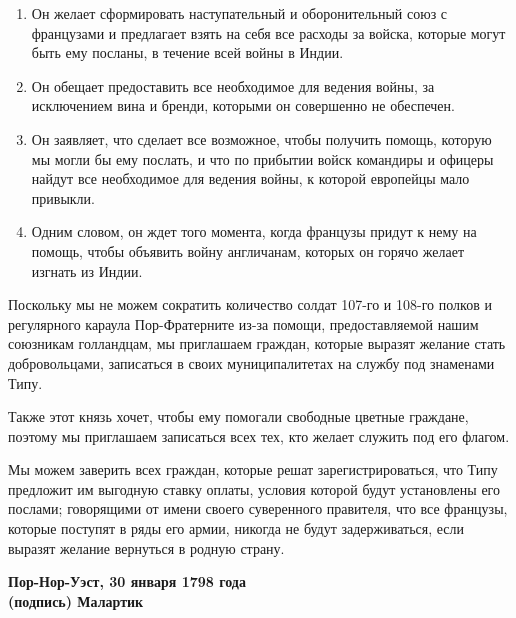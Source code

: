 \documentclass[
  oneside,
  12pt,
  titlepage]{book}
\begin{document}
\begin{enumerate}
\def\labelenumi{\arabic{enumi}.}
\item
  Он желает сформировать наступательный и оборонительный союз с французами и предлагает взять на себя все расходы за войска, которые могут быть ему посланы, в течение всей войны в Индии.
\item
  Он обещает предоставить все необходимое для ведения войны, за исключением вина и бренди, которыми он совершенно не обеспечен.
\item
  Он заявляет, что сделает все возможное, чтобы получить помощь, которую мы могли бы ему послать, и что по прибытии войск командиры и офицеры найдут все необходимое для ведения войны, к которой европейцы мало привыкли.
\item
  Одним словом, он ждет того момента, когда французы придут к нему на помощь, чтобы объявить войну англичанам, которых он горячо желает изгнать из Индии.
\end{enumerate}

Поскольку мы не можем сократить количество солдат 107-го и 108-го полков и регулярного караула Пор-Фратерните из-за помощи, предоставляемой нашим союзникам голландцам, мы приглашаем граждан, которые выразят желание стать добровольцами, записаться в своих муниципалитетах на службу под знаменами Типу.

Также этот князь хочет, чтобы ему помогали свободные цветные граждане, поэтому мы приглашаем записаться всех тех, кто желает служить под его флагом.

Мы можем заверить всех граждан, которые решат зарегистрироваться, что Типу предложит им выгодную ставку оплаты, условия которой будут установлены его послами; говорящими от имени своего суверенного правителя, что все французы, которые поступят в ряды его армии, никогда не будут задерживаться, если выразят желание вернуться в родную страну.

\textbf{Пор-Нор-Уэст, 30 января 1798 года\\
(подпись) Малартик}
\end{document}
